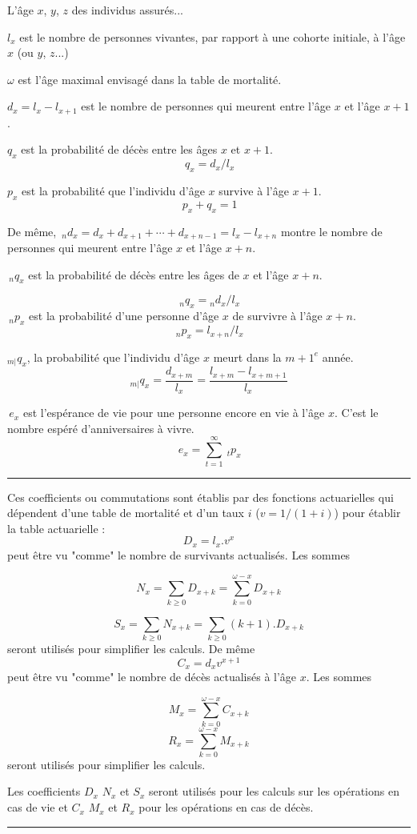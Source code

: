 
\begin{f}

L'âge \(x\), \(y\), \(z\) des individus assurés...    

\(l_x\) est le nombre de personnes vivantes, par rapport à une cohorte initiale, à l'âge \(x\) (ou \(y\), \(z\)...)

\(\omega\) est l'âge maximal envisagé dans la table de mortalité.

\(d_x=l_x-l_{x+1}\) est le nombre de personnes qui meurent entre l'âge \(x\) et l'âge \(x+1\).

\(q_x\) est la probabilité de décès entre les âges  \(x\) et \({x+1}\).
\[
\,q_x = d_x / l_x 
\]

\(p_x\) est la probabilité que l'individu  d'âge \(x\) survive à l'âge \(x+1\).
\[
\,p_x+q_x=1 
\]

De même, 
\(\,_nd_x = d_x + d_{x+1} + \cdots + d_{x+n-1} = l_x - l_{x+n}\) montre le nombre de personnes qui meurent entre l'âge \(x\) et l'âge \(x+n\).

\(\,_nq_x\) est la probabilité de décès entre les âges de \(x\) et l'âge \(x+n\).

\[
\,_nq_x = {}_nd_x / l_x
\]
\(\,_np_x\) est la probabilité d'une personne d'âge \(x\) de survivre à l'âge \(x+n\).
\[
\,_np_x = l_{x+n} / l_x 
\]


\({}_{m|}q_{x}\), la probabilité que l'individu d'âge \(x\) meurt dans la \({m+1}^e\) année.
\[{}_{m|}q_{x}=\frac{d_{x+m}}{l_x}=\frac{l_{x+m}-l_{x+m+1}}{l_x}\]

\(\,e_x\)  est l'espérance de vie pour une personne encore en vie à l'âge \(x\). 
C'est le nombre espéré d'anniversaires à vivre.
\[
\,e_x = \sum_{t=1}^{\infty} \ _tp_x 
\]
\end{f}
\hrule

\begin{f}


Ces coefficients ou commutations sont établis par des fonctions actuarielles qui dépendent d'une table de mortalité et d'un taux \(i\) (\(v=1/(1+i)\)) pour établir la table actuarielle :
\[
D_x=l_x .v^x
\]
peut être vu "comme" le nombre de survivants actualisés. Les sommes 

\[
N_x=\sum_{k\geq 0} D_{x+k}=\sum_{k= 0}^{\omega-x} D_{x+k}
\]

\[
S_x=\sum_{k\geq 0} N_{x+k}=\sum_{k\geq 0}(k+1). D_{x+k}
\]
seront utilisés pour simplifier les calculs.
De même
\[
C_x = d_x v^{ x+1} 
\]
peut être vu "comme" le nombre de décès  actualisés à l'âge \(x\). Les sommes

\[
M_x=\sum_{k= 0}^{\omega-x} C_{x+k}
\]
\[
R_x=\sum_{k= 0}^{\omega-x} M_{x+k}
\]
seront utilisés pour simplifier les calculs.

Les  coefficients \(D_x\) \(N_x\) et \(S_x\) seront utilisés pour les calculs sur les opérations en cas de vie et \(C_x\) \(M_x\) et \(R_x\)  pour les opérations en cas de décès.

\end{f} 
\hrule

